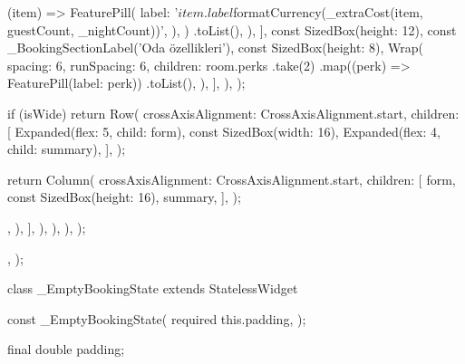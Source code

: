 \documentclass[11pt,a4paper]{article}
\begin{document}
\begin{codeblock}
{{{{                                      (item) => FeaturePill(
                                        label:
                                            '${item.label} ${formatCurrency(_extraCost(item, guestCount, _nightCount))}',
                                      ),
                                    )
                                    .toList(),
                              ),
                            ],
                            const SizedBox(height: 12),
                            const _BookingSectionLabel('Oda özellikleri'),
                            const SizedBox(height: 8),
                            Wrap(
                              spacing: 6,
                              runSpacing: 6,
                              children: room.perks
                                  .take(2)
                                  .map((perk) => FeaturePill(label: perk))
                                  .toList(),
                            ),
                          ],
                        ),
                      );

                      if (isWide) {
                        return Row(
                          crossAxisAlignment: CrossAxisAlignment.start,
                          children: [
                            Expanded(flex: 5, child: form),
                            const SizedBox(width: 16),
                            Expanded(flex: 4, child: summary),
                          ],
                        );
                      }

                      return Column(
                        crossAxisAlignment: CrossAxisAlignment.start,
                        children: [
                          form,
                          const SizedBox(height: 16),
                          summary,
                        ],
                      );
                    },
                  ),
                ],
              ),
            ),
          ),
        );
      },
    );
  }
}

class _EmptyBookingState extends StatelessWidget {
  const _EmptyBookingState({
    required this.padding,
  });

  final double padding;

}
\end{codeblock}
\end{document}
